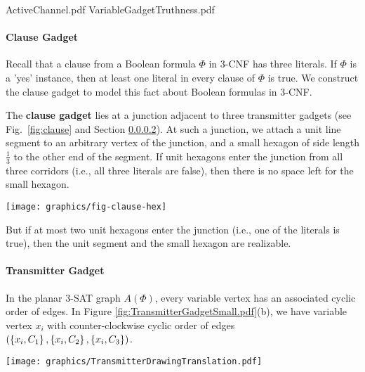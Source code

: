 ActiveChannel.pdf
VariableGadgetTruthness.pdf


\paragraph{Clause Gadget}
Recall that a clause from a Boolean formula $\Phi$ in 3-CNF has three literals.  If $\Phi$ is a  'yes' instance, then at least one literal in every clause of $\Phi$ is true.  We construct the clause gadget to model this fact about Boolean formulas in 3-CNF.

The {\bf clause gadget} lies at a junction adjacent to three transmitter gadgets (see Fig.~\ref{fig:clause} and Section \ref{transmitterGadget}). 
At such a junction, we attach a unit line segment to an arbitrary vertex of the junction, and a small hexagon of side length $\frac{1}{3}$ to the other end of the segment. 
If unit hexagons enter the junction from all three corridors (i.e., all three literals are false), then there is no space left for the small hexagon. 

\begin{minipage}{\linewidth}
\begin{center}
\texttt{[image: graphics/fig-clause-hex]}
\label{fig:clause}
\end{center}
\end{minipage}

But if at most two unit hexagons enter the junction (i.e., one of the literals is true), then the unit segment and the small hexagon are realizable.

\paragraph{Transmitter Gadget}\label{transmitterGadget}

In the planar 3-SAT graph $A(\Phi)$, every variable vertex has an associated cyclic order of edges.
In Figure \ref{fig:TransmitterGadgetSmall.pdf}(b), we have variable vertex $x_i$ with counter-clockwise cyclic order of edges $\left( \left\lbrace x_i,C_1\right\rbrace,\left\lbrace x_i,C_2\right\rbrace,\left\lbrace x_i,C_3\right\rbrace  \right)$. 

\begin{minipage}{\linewidth}
\begin{center}
\texttt{[image: graphics/TransmitterDrawingTranslation.pdf]}
\label{fig:TransmitterGadgetSmall.pdf}
\end{center}
\end{minipage} 

